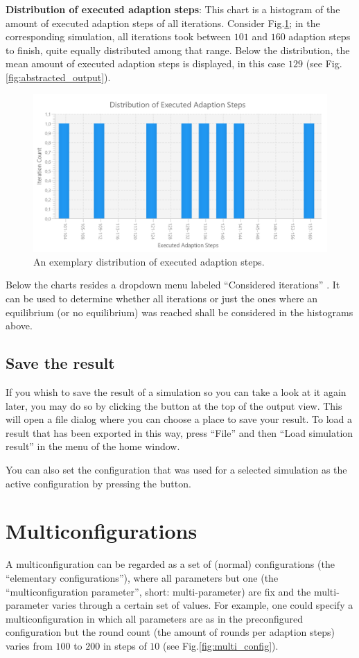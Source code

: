 \documentclass[parskip=full,11pt]{scrartcl}
\newcommand*\circled[1]{\tikz[baseline=(char.base)]{
            \node[shape=circle,draw,inner sep=2pt] (char) {#1};}}
\newlength\myheight
\newlength\mydepth
\newcommand*\inlinegraphics[1]{%
  \settototalheight\myheight{Xygp}%
  \settodepth\mydepth{Xygp}%
  \raisebox{-1.8\mydepth}{\texttt{[image: \#1]}}%
}
\begin{document}
\textbf{Distribution of executed adaption steps}: This chart \circled{3} is a histogram of the amount of executed adaption steps of all iterations. Consider Fig.\ref{fig:adapts_distribution}; in the corresponding simulation, all iterations took between \(101\) and \(160\) adaption steps to finish, quite equally distributed among that range. Below the distribution, the mean amount of executed adaption steps is displayed, in this case \(129\) (see Fig.\ref{fig:abstracted_output}).

\begin{figure}[h]
	\centering
	\includegraphics[width=0.7\linewidth]{img_manual/adapts_distribution.png}
	\caption{An exemplary distribution of executed adaption steps.}
	\label{fig:adapts_distribution}
\end{figure}

Below the charts resides a dropdown menu labeled \enquote{Considered iterations} \circled{4}. It can be used to determine whether all iterations or just the ones where an equilibrium (or no equilibrium) was reached shall be considered in the histograms above.

\subsection{Save the result}
If you whish to save the result of a simulation so you can take a look at it again later, you may do so by clicking the  \inlinegraphics{img_manual/export_button.png} button at the top of the output view. This will open a file dialog where you can choose a place to save your result. To load a result that has been exported in this way, press \enquote{File} and then \enquote{Load simulation result} in the menu of the home window.

You can also set the configuration that was used for a selected simulation as the active configuration by pressing the  \inlinegraphics{img_manual/rotate_right_button.png} button.

\pagebreak
\section{Multiconfigurations}\label{sec:multi_config}
A multiconfiguration can be regarded as a set of (normal) configurations (the \enquote{elementary configurations}), where all parameters but one (the \enquote{multiconfiguration parameter}, short: multi-parameter) are fix and the multi-parameter varies through a certain set of values. For example, one could specify a multiconfiguration in which all parameters are as in the preconfigured configuration but the round count (the amount of rounds per adaption steps) varies from \(100\) to \(200\) in steps of \(10\) (see Fig.\ref{fig:multi_config}).
\end{document}
